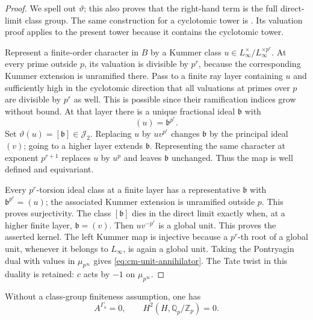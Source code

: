 \begin{proof}
We spell out \(\vartheta\); this also proves that the right-hand term
is the full direct-limit class group.
The same construction for a cyclotomic tower is
\cite[Proposition 3.3.9 and Corollary 3.3.14]{SharifiIwasawaNotes}.
Its valuation proof applies to the present tower because it
contains the cyclotomic tower.

Represent a finite-order character in \(B\) by a Kummer class
\(u\in L_\infty^\times/L_\infty^{\times p^r}\).
At every prime outside \(p\), its valuation is divisible by \(p^r\),
because the corresponding Kummer extension is unramified there.
Pass to a finite ray layer containing \(u\) and sufficiently high
in the cyclotomic direction that all valuations at primes over
\(p\) are divisible by \(p^r\) as well.
This is possible since their ramification indices grow without
bound.
At that layer there is a unique fractional ideal \(\mathfrak b\)
with
\[
                         (u)=\mathfrak b^{p^r}.
\]
Set \(\vartheta(u)=[\mathfrak b]\in\mathcal J_2\).
Replacing \(u\) by \(uv^{p^r}\) changes \(\mathfrak b\) by
the principal ideal \((v)\); going to a higher layer extends
\(\mathfrak b\).
Representing the same character at exponent \(p^{r+1}\) replaces
\(u\) by \(u^p\) and leaves \(\mathfrak b\) unchanged.
Thus the map is well defined and equivariant.

Every \(p^r\)-torsion ideal class at a finite layer has a
representative \(\mathfrak b\) with
\(\mathfrak b^{p^r}=(u)\); the associated Kummer extension is
unramified outside \(p\).
This proves surjectivity.
The class \([\mathfrak b]\) dies in the direct limit exactly when,
at a higher finite layer, \(\mathfrak b=(v)\).
Then \(uv^{-p^r}\) is a global unit.
This proves the asserted kernel.
The left Kummer map is injective because a \(p^r\)-th root of a
global unit, whenever it belongs to \(L_\infty\), is again a global
unit.
Taking the Pontryagin dual with values in \(\mu_{p^\infty}\)
gives \eqref{eq:cm-unit-annihilator}.
The Tate twist in this duality is retained: \(c\) acts by \(-1\)
on \(\mu_{p^\infty}\).
\end{proof}

\begin{lemma}\label{lem:cm-anticyclotomic-invariants}
Without a class-group finiteness assumption, one has
\[
 A^{\Gamma_{\mathrm a}}=0,\qquad
 H^2(H,\mathbb Q_p/\mathbb Z_p)=0 .
\]
\end{lemma}

